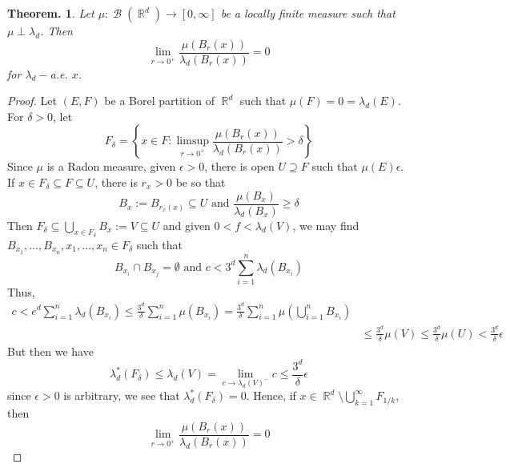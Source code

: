\documentclass[11pt, a4paper]{memoir}
\DeclareMathOperator{\R}{{\mathbb{R}}}
\theoremstyle{change}
\newtheorem{theorem}{Theorem.}[section]
\theoremstyle{plain}
\theoremstyle{nonumberplain}
\newtheorem{proof}{Proof}
\DeclareMathOperator{\B}{{\mathcal{B}}}
\begin{document}
\begin{theorem}
    Let $\mu:\B(\R^d)\to[0,\infty]$ be a locally finite measure such that $\mu\perp\lambda_d$.
    Then
    \begin{equation*}
        \lim_{r\to 0^+}\frac{\mu(B_r(x))}{\lambda_d(B_r(x))}=0
    \end{equation*}
    for $\lambda_d-$a.e. $x$.
\end{theorem}
\begin{proof}
    Let $(E,F)$ be a Borel partition of $\R^d$ such that $\mu(F)=0=\lambda_d(E)$.
    For $\delta>0$, let
    \begin{equation*}
        F_\delta=\left\{x\in F:\limsup_{r\to 0^+}\frac{\mu(B_r(x))}{\lambda_d(B_r(x))}>\delta\right\}
    \end{equation*}
    Since $\mu$ is a Radon measure, given $\epsilon>0$, there is open $U\supseteq F$ such that $\mu(E)\epsilon$.
    If $x\in F_\delta\subseteq F\subseteq U$, there is $r_x>0$ be so that
    \begin{equation*}
        B_x:=B_{r_x(x)}\subseteq U\text{ and }\frac{\mu(B_x)}{\lambda_d(B_x)}\geq\delta
    \end{equation*}
    Then $F_\delta\subseteq\bigcup_{x\in F_\delta}B_x:=V\subseteq U$ and given $0<f<\lambda_d(V)$, we may find $B_{x_1},\ldots,B_{x_n},x_1,\ldots,x_n\in F_\delta$ such that
    \begin{equation*}
        B_{x_i}\cap B_{x_j}=\emptyset\text{ and }c<3^d\sum_{i=1}^n \lambda_d(B_{x_i})
    \end{equation*}
    Thus,
    \begin{align*}
        c<e^d\sum_{i=1}^n\lambda_d(B_{x_i})\leq\frac{3^d}{\delta}\sum_{i=1}^n\mu(B_{x_i})=\frac{3^d}{\delta}\sum_{i=1}^n\mu\left(\bigcup_{i=1}^n B_{x_i}\right)\\
        &\leq\frac{3^d}{\delta}\mu(V)\leq\frac{3^d}{\delta}\mu(U)<\frac{3^d}{\delta}\epsilon
    \end{align*}
    But then we have
    \begin{equation*}
        \lambda_d^*(F_\delta)\leq\lambda_d(V)=\lim_{c\to\lambda_d(V)^-}c\leq\frac{3^d}{\delta}\epsilon
    \end{equation*}
    since $\epsilon>0$ is arbitrary, we see that $\lambda_d^*(F_\delta)=0$.
    Hence, if $x\in\R^d\setminus\bigcup_{k=1}^\infty F_{1/k}$, then
    \begin{equation*}
        \lim_{r\to 0^+}\frac{\mu(B_r(x))}{\lambda_d(B_r(x))}=0
    \end{equation*}
\end{proof}
\end{document}
